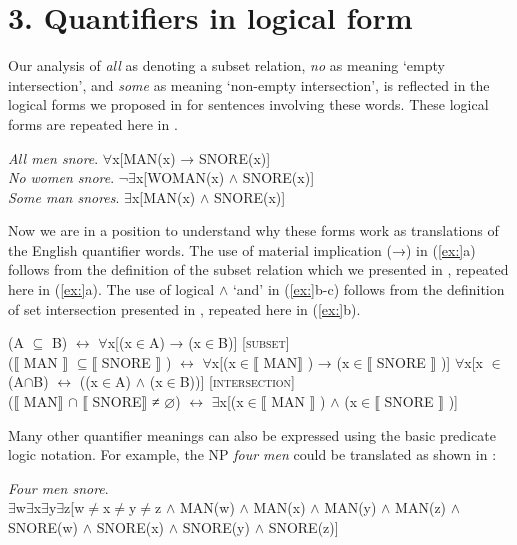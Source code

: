 \section{3. Quantifiers in logical form}\label{sec:}

Our analysis of \textit{all} as denoting a subset relation, \textit{no} as meaning ‘empty intersection’, and \textit{some} as meaning ‘non-empty intersection’, is reflected in the logical forms we proposed in  for sentences involving these words. These logical forms are repeated here in .


\ea
\ea \textit{All men snore}.  ${\forall}$x[MAN(x) → SNORE(x)]\\
\ex \textit{No women snore}.  ${\lnot}$${\exists}$x[WOMAN(x) $\wedge$ SNORE(x)]\\
\ex \textit{Some man snores}.  ${\exists}$x[MAN(x) $\wedge$ SNORE(x)]
                       \z
\z


Now we are in a position to understand why these forms work as translations of the English quantifier words. The use of material implication (→) in (\ref{ex:}a) follows from the definition of the subset relation which we presented in , repeated here in (\ref{ex:}a). The use of logical $\wedge$ ‘and’ in (\ref{ex:}b-c) follows from the definition of set intersection presented in , repeated here in (\ref{ex:}b).


\ea
\ea  (A ${\subseteq}$ B)  $\leftrightarrow $  ${\forall}$x[(x${\in}$A) → (x${\in}$B)]  [\textsc{subset}]\\
  ($\llbracket$ MAN $\rrbracket$  ${\subseteq} \llbracket$ SNORE $\rrbracket$ )  $\leftrightarrow $  ${\forall}$x[(x${\in}\llbracket$ MAN$\rrbracket$ ) → (x${\in}\llbracket$ SNORE $\rrbracket$ )]
\ex  ${\forall}$x[x ${\in}$ (A${\cap}$B)  $\leftrightarrow $  ((x${\in}$A) $\wedge$ (x${\in}$B))]  [\textsc{intersection}]\\
  ($\llbracket$ MAN$\rrbracket$ ${\cap}$ $\llbracket$ SNORE$\rrbracket$  ≠ ⌀) $\leftrightarrow $  ${\exists}$x[(x${\in}\llbracket$ MAN $\rrbracket$ ) $\wedge$ (x${\in} \llbracket$  SNORE $\rrbracket$ )]
\z \z


Many other quantifier meanings can also be expressed using the basic predicate logic notation. For example, the NP \textit{four men} could be translated as shown in :


\ea
\textit{Four men snore}.\\
${\exists}$w${\exists}$x${\exists}$y${\exists}$z[w${\neq}$x${\neq}$y${\neq}$z $\wedge$ MAN(w) $\wedge$ MAN(x) $\wedge$ MAN(y) $\wedge$ MAN(z) $\wedge$ SNORE(w) $\wedge$ SNORE(x) $\wedge$ SNORE(y) $\wedge$ SNORE(z)]
\z



